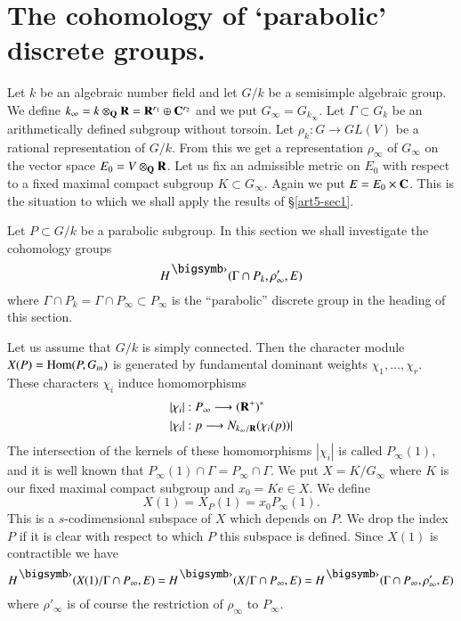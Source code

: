 \section{The cohomology of `parabolic' discrete groups.}\label{art5-sec2}
Let $k$ be an algebraic number field and let $G/ k$ be a semisimple algebraic group. We define $k_\infty = k \otimes_{\mathbf{Q}} \mathbf{R} = \mathbf{R}^{r_1} \oplus \mathbf{C}^{r_2}$ and we put $G_\infty = G_{k_\infty}$. Let $\Gamma \subset G_k$ be an arithmetically defined subgroup without torsoin. Let $\rho_k : G \to G L(V)$ be a rational representation of $G/ k$. From this we get a representation $\rho_\infty$ of $G_\infty$ on the vector space $E_0 = V \otimes_{\mathbf{Q}} \mathbf{R}$. Let us fix an admissible metric on $E_0$ with respect to a fixed maximal compact subgroup $K \subset G_\infty$. Again we put $E = E_0 \times \mathbf{C}$. This is the situation to which we shall apply the results of \S \ref{art5-sec1}.

Let $P \subset G/k$ be a parabolic subgroup. In this section we shall investigate the cohomology groups 
$$
H^\bigdot (\Gamma \cap P_k, \rho'_\infty, E)
$$
where $\Gamma \cap P_k = \Gamma \cap P_\infty \subset P_\infty$ is the ``parabolic'' discrete group in the heading of this section.

Let us assume that $G/k$ is simply connected. Then the character module $X (P) =\operatorname{Hom} (P, G_m)$ is generated by fundamental dominant weights $\chi_1, \ldots, \chi_r$. These characters $\chi_i$ induce homomorphisms
\begin{align*}
& |\chi_i| : P_\infty \longrightarrow (\mathbf{R}^+)^\ast \\
& |\chi_i| : p \longrightarrow N_{k_\infty/\mathbf{R}} (\chi_i (p)) |
\end{align*}
The intersection of the kernels of these homomorphisms $|\chi_i|$ is called $P_\infty(1)$, and it is well known that $P_\infty (1) \cap \Gamma = P_\infty \cap \Gamma$. We put $X = K / G_\infty$ where $K$ is our fixed maximal compact subgroup and $x_0 = K e \in X$. We define
$$
X(1) = X_P (1) = x_0 P_\infty (1).
$$
This is a $s$-codimensional subspace of $X$ which depends on $P$. We drop the index $P$ if it is clear with respect to which $P$ this subspace is defined. Since $X (1)$ is contractible we have 
$$
H^\bigdot (X(1)/ \Gamma \cap P_\infty, E) = H^\bigdot (X/ \Gamma \cap P_\infty, E) = H^\bigdot (\Gamma \cap P_\infty, \rho'_\infty, E)
$$\pageoriginale
where $\rho'_\infty$ is of course the restriction of $\rho_\infty$ to $P_\infty$.

